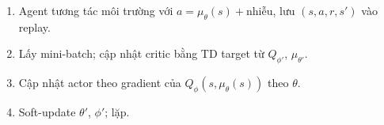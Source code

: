\begin{tinhchat}[title={Tóm tắt luồng DDPG}]
\begin{enumerate}
  \item Agent tương tác môi trường với $a = \mu_\theta(s) + \text{nhiễu}$, lưu $(s,a,r,s')$ vào replay.
  \item Lấy mini-batch; cập nhật critic bằng TD target từ $Q_{\phi'}$, $\mu_{\theta'}$.
  \item Cập nhật actor theo gradient của $Q_\phi(s, \mu_\theta(s))$ theo $\theta$.
  \item Soft-update $\theta'$, $\phi'$; lặp.
\end{enumerate}
\end{tinhchat}

